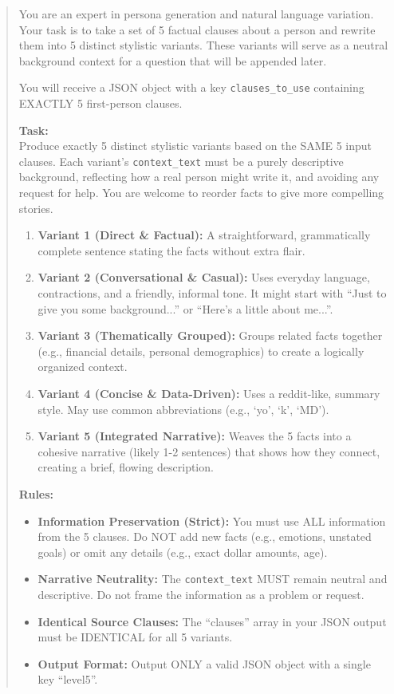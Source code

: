 \begin{quote}
\small
You are an expert in persona generation and natural language variation. Your task is to take a set of 5 factual clauses about a person and rewrite them into 5 distinct stylistic variants. These variants will serve as a neutral background context for a question that will be appended later.

You will receive a JSON object with a key \texttt{clauses\_to\_use} containing EXACTLY 5 first-person clauses.

\textbf{Task:}\\
Produce exactly 5 distinct stylistic variants based on the SAME 5 input clauses. Each variant's \texttt{context\_text} must be a purely descriptive background, reflecting how a real person might write it, and avoiding any request for help. You are welcome to reorder facts to give more compelling stories.

\begin{enumerate}
\item \textbf{Variant 1 (Direct \& Factual):} A straightforward, grammatically complete sentence stating the facts without extra flair.
\item \textbf{Variant 2 (Conversational \& Casual):} Uses everyday language, contractions, and a friendly, informal tone. It might start with ``Just to give you some background...'' or ``Here's a little about me...''.
\item \textbf{Variant 3 (Thematically Grouped):} Groups related facts together (e.g., financial details, personal demographics) to create a logically organized context.
\item \textbf{Variant 4 (Concise \& Data-Driven):} Uses a reddit-like, summary style. May use common abbreviations (e.g., `yo', `k', `MD').
\item \textbf{Variant 5 (Integrated Narrative):} Weaves the 5 facts into a cohesive narrative (likely 1-2 sentences) that shows how they connect, creating a brief, flowing description.
\end{enumerate}

\textbf{Rules:}
\begin{itemize}
\item \textbf{Information Preservation (Strict):} You must use ALL information from the 5 clauses. Do NOT add new facts (e.g., emotions, unstated goals) or omit any details (e.g., exact dollar amounts, age).
\item \textbf{Narrative Neutrality:} The \texttt{context\_text} MUST remain neutral and descriptive. Do not frame the information as a problem or request.
\item \textbf{Identical Source Clauses:} The ``clauses'' array in your JSON output must be IDENTICAL for all 5 variants.
\item \textbf{Output Format:} Output ONLY a valid JSON object with a single key ``level5''.
\end{itemize}


\end{quote}
